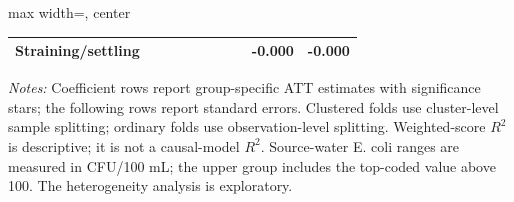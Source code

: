 \begin{landscape}
\begin{table}[p]
\begin{adjustbox}{max width=\linewidth, center}
\begin{tabular}{llcccccccc}
\quad Straining/settling &  &  &  &  &  &  &  & -0.000 & -0.000 \\
\bottomrule
\end{tabular}
\end{adjustbox}
\par\vspace{3pt}
\begin{minipage}{\linewidth}\footnotesize \textit{Notes:} Coefficient rows report group-specific ATT estimates with significance stars; the following rows report standard errors. Clustered folds use cluster-level sample splitting; ordinary folds use observation-level splitting. Weighted-score $R^2$ is descriptive; it is not a causal-model $R^2$. Source-water E. coli ranges are measured in CFU/100 mL; the upper group includes the top-coded value above 100. The heterogeneity analysis is exploratory.\end{minipage}
\end{table}
\end{landscape}